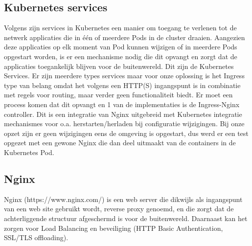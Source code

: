 \subsection{Kubernetes services}
Volgens \textcite{Kubernetes2023b} zijn services in Kubernetes een manier om toegang te verlenen tot de netwerk applicaties die in één of meerdere Pods in de cluster draaien.
\newline
Aangezien deze applicaties op elk moment van Pod kunnen wijzigen of in meerdere Pods opgestart worden, is er een mechanisme nodig die dit opvangt en zorgt dat de applicaties toegankelijk blijven voor de buitenwereld. Dit zijn de Kubernetes Services.
\newline
Er zijn meerdere types services maar voor onze oplossing is het Ingress type van belang omdat het volgens \autocite{Kubernetes2023d} een HTTP(S) ingangspunt is in combinatie met regels voor routing, maar verder geen functionaliteit biedt. Er moet een process komen dat dit opvangt en 1 van de implementaties is de Ingress-Nginx controller. Dit is een integratie van Nginx uitgebreid met Kubernetes integratie mechanismes voor o.a. herstarten/herladen bij configuratie wijzigingen. Bij onze opzet zijn er geen wijzigingen eens de omgeving is opgestart, dus werd er een test opgezet met een gewone Nginx die dan deel uitmaakt van de containers in de Kubernetes Pod.

\subsection{Nginx}
Nginx (https://www.nginx.com/) is een web server die dikwijls als ingangspunt van een web site gebruikt wordt, reverse proxy genoemd, en die zorgt dat de achterliggende structuur afgeschermd is voor de buitenwereld. Daarnaast kan het zorgen voor Load Balancing en beveiliging (HTTP Basic Authentication, SSL/TLS offloading).
\newline
\newline


